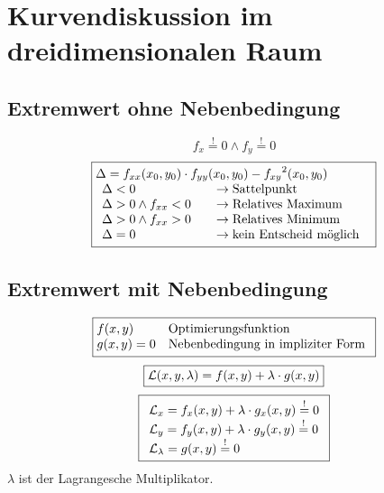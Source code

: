 \newpage

\section{Kurvendiskussion im dreidimensionalen Raum}

\subsection{Extremwert ohne Nebenbedingung}
\[ \boxed{f_x \stackrel{!}{=} 0 \land f_y \stackrel{!}{=} 0} \]
\[ \boxed{\begin{array}{@{}l}
\Delta = f_{xx}(x_0, y_0) \cdot f_{yy}(x_0, y_0) - {f_{xy}}^2(x_0, y_0) \\
\begin{array}{ll}
\Delta < 0 \quad                    & \rightarrow \text{Sattelpunkt} \\
\Delta > 0 \land f_{xx} < 0 \quad   & \rightarrow \text{Relatives Maximum} \\
\Delta > 0 \land f_{xx} > 0 \quad   & \rightarrow \text{Relatives Minimum} \\
\Delta = 0                  \quad   & \rightarrow \text{kein Entscheid möglich}
\end{array}\end{array}} \]

\subsection{Extremwert mit Nebenbedingung}
\[ \boxed{\begin{array}{@{}ll}
f(x,y) & \text{Optimierungsfunktion} \\
g(x,y) = 0 & \text{Nebenbedingung in impliziter Form} \\
\end{array}} \]
\[ \boxed{\mathcal{L}(x,y,\lambda) = f(x,y) + \lambda \cdot g(x,y)} \]
\[ \boxed{\begin{array}{l}
\mathcal{L}_x = f_x(x,y) + \lambda \cdot g_x(x,y) \stackrel{!}{=} 0 \\
\mathcal{L}_y = f_y(x,y) + \lambda \cdot g_y(x,y) \stackrel{!}{=} 0 \\
\mathcal{L}_\lambda = g(x,y) \stackrel{!}{=} 0 \\
\end{array}} \]
$\lambda$ ist der Lagrangesche Multiplikator. 

